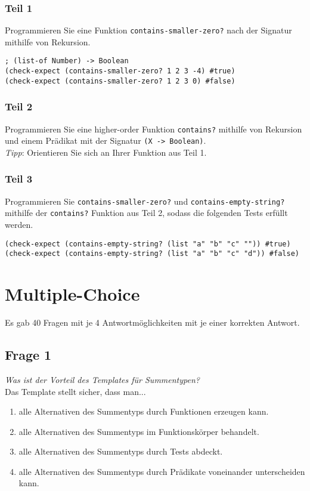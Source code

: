 \documentclass[a4paper, 11pt]{article}
\begin{document}
\subsubsection*{Teil 1}
Programmieren Sie eine Funktion \texttt{contains-smaller-zero?} nach der Signatur mithilfe von Rekursion.
\begin{verbatim}
; (list-of Number) -> Boolean
(check-expect (contains-smaller-zero? 1 2 3 -4) #true)
(check-expect (contains-smaller-zero? 1 2 3 0) #false)
\end{verbatim}

\subsubsection*{Teil 2}
Programmieren Sie eine higher-order Funktion \texttt{contains?} mithilfe von Rekursion und einem Prädikat mit der Signatur \texttt{(X -> Boolean)}.\\\textit{Tipp}: Orientieren Sie sich an Ihrer Funktion aus Teil 1.

\subsubsection*{Teil 3}
Programmieren Sie \texttt{contains-smaller-zero?} und \texttt{contains-empty-string?} mithilfe der \texttt{contains?} Funktion aus Teil 2, sodass die folgenden Tests erfüllt werden.
\begin{verbatim}
(check-expect (contains-empty-string? (list "a" "b" "c" "")) #true)
(check-expect (contains-empty-string? (list "a" "b" "c" "d")) #false)
\end{verbatim}

\section{Multiple-Choice}
Es gab 40 Fragen mit je 4 Antwortmöglichkeiten mit je einer korrekten Antwort.

\subsection*{Frage 1}
\textit{Was ist der Vorteil des Templates für Summentypen?}\\
Das Template stellt sicher, dass man...
\begin{enumerate}[label=$\square$]
	\item alle Alternativen des Summentyps durch Funktionen erzeugen kann.
	\item alle Alternativen des Summentyps im Funktionskörper behandelt.
	\item alle Alternativen des Summentyps durch Tests abdeckt.
	\item alle Alternativen des Summentyps durch Prädikate voneinander unterscheiden kann.
\end{enumerate}
\end{document}
